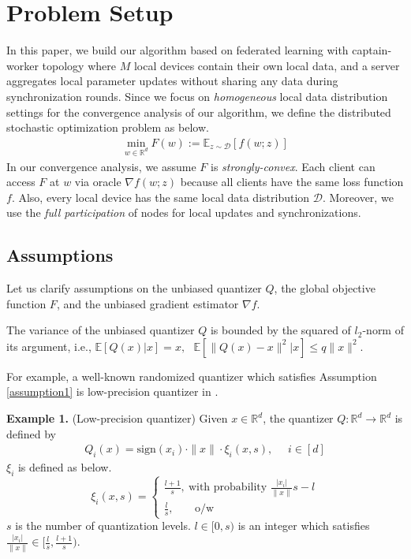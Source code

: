 \section{Problem Setup} \label{problem_setup}

In this paper, we build our algorithm based on federated learning with captain-worker topology where $M$ local devices contain their own local data, and a server aggregates local parameter updates without sharing any data during synchronization rounds. Since we focus on \emph{homogeneous} local data distribution settings for the convergence analysis of our algorithm, we define the distributed stochastic optimization problem as below.
\begin{align*}
    \min_{w \in \mathbb{R}^d} F(w) := \mathbb{E}_{z\sim\mathcal{D}}[f(w;z)]
\end{align*}
In our convergence analysis, we assume $F$ is \emph{strongly-convex}. Each client can access $F$ at $w$ via oracle $\nabla f(w;z)$ because all clients have the same loss function $f$. Also, every local device has the same local data distribution $\mathcal{D}$. Moreover, we use the \emph{full participation} of nodes for local updates and synchronizations.

\subsection{Assumptions}

Let us clarify assumptions on the unbiased quantizer $Q$, the global objective function $F$, and the unbiased gradient estimator $\nabla f$.

\begin{assumption} \label{assumption1}
The variance of the unbiased quantizer $Q$ is bounded by the squared of $l_2$-norm of its argument, i.e., $\mathbb{E}[Q(x)|x]=x, \textrm{ } \mathbb{E}[\|Q(x) - x\|^2 |x] \leq q \|x\|^2$.
\end{assumption}
For example, a well-known randomized quantizer which satisfies Assumption \ref{assumption1} is low-precision quantizer in \cite {alistarh2017qsgd}.

\textbf{Example 1.} (Low-precision quantizer) Given $x \in \mathbb{R}^d$, the quantizer $Q:\mathbb{R}^d \rightarrow \mathbb{R}^d$ is defined by
\begin{align*}
    Q_i(x) = \textrm{sign}(x_i)\cdot\|x\|\cdot \xi_i(x, s),   \textrm{ } \textrm{ } i \in [d]
\end{align*}
$\xi_i$ is defined as below.
$$\xi_i(x, s)=
\begin{cases}
\frac{l+1}{s},~\textrm{with probability } \frac{|x_i|}{\|x\|}s - l\\
\frac{l}{s},~\textrm{ } \textrm{ } \textrm{ o/w}
\end{cases}$$
$s$ is the number of quantization levels. $l \in [0, s)$ is an integer which satisfies $\frac{|x_i|}{\|x\|} \in [\frac{l}{s}, \frac{l+1}{s})$.

